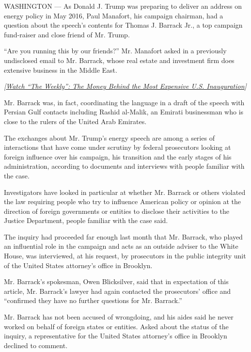 WASHINGTON --- As Donald J. Trump was preparing to deliver an address on
energy policy in May 2016, Paul Manafort, his campaign chairman, had a
question about the speech's contents for Thomas J. Barrack Jr., a top
campaign fund-raiser and close friend of Mr. Trump.

``Are you running this by our friends?'' Mr. Manafort asked in a
previously undisclosed email to Mr. Barrack, whose real estate and
investment firm does extensive business in the Middle East.

\emph{{[}}\href{https://www.nytimes.com/2019/06/26/the-weekly/trump-inauguration-expensive.html}{\emph{Watch
``The Weekly'': The Money Behind the Most Expensive U.S.
Inauguration}}\emph{{]}}

Mr. Barrack was, in fact, coordinating the language in a draft of the
speech with Persian Gulf contacts including Rashid al-Malik, an Emirati
businessman who is close to the rulers of the United Arab Emirates.

The exchanges about Mr. Trump's energy speech are among a series of
interactions that have come under scrutiny by federal prosecutors
looking at foreign influence over his campaign, his transition and the
early stages of his administration, according to documents and
interviews with people familiar with the case.

Investigators have looked in particular at whether Mr. Barrack or others
violated the law requiring people who try to influence American policy
or opinion at the direction of foreign governments or entities to
disclose their activities to the Justice Department, people familiar
with the case said.

The inquiry had proceeded far enough last month that Mr. Barrack, who
played an influential role in the campaign and acts as an outside
adviser to the White House, was interviewed, at his request, by
prosecutors in the public integrity unit of the United States attorney's
office in Brooklyn.

Mr. Barrack's spokesman, Owen Blicksilver, said that in expectation of
this article, Mr. Barrack's lawyer had again contacted the prosecutors'
office and ``confirmed they have no further questions for Mr. Barrack.''

Mr. Barrack has not been accused of wrongdoing, and his aides said he
never worked on behalf of foreign states or entities. Asked about the
status of the inquiry, a representative for the United States attorney's
office in Brooklyn declined to comment.

